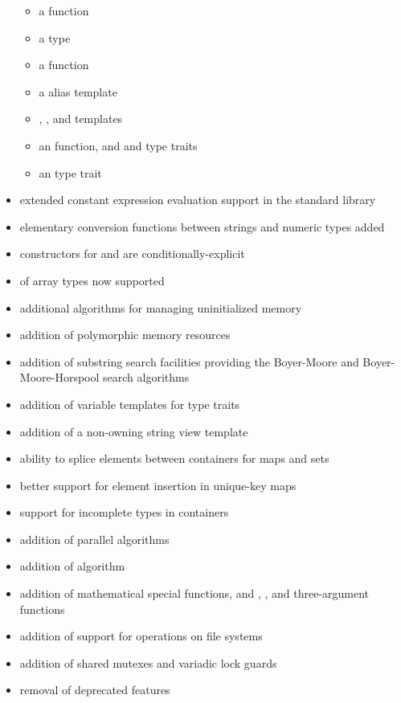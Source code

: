 \begin{itemize}
\begin{itemize}
  \item a  function
  \item a  type
  \item a  function
  \item a  alias template
  \item {}, , and  templates
  \item an  function, and  and  type traits
  \item an  type trait
\end{itemize}
\item extended constant expression evaluation support in the standard library
\item elementary conversion functions between strings and numeric types added
\item constructors for  and  are conditionally-explicit
\item {} of array types now supported
\item additional algorithms for managing uninitialized memory
\item addition of polymorphic memory resources
\item addition of substring search facilities providing the Boyer-Moore and Boyer-Moore-Horspool search algorithms
\item addition of variable templates for type traits
\item addition of a non-owning string view template
\item ability to splice elements between containers for maps and sets
\item better support for element insertion in unique-key maps
\item support for incomplete types in containers
\item addition of parallel algorithms
\item addition of  algorithm
\item addition of mathematical special functions, and , , and three-argument  functions
\item addition of support for operations on file systems
\item addition of shared mutexes and variadic lock guards
\item removal of deprecated features
\end{itemize}
